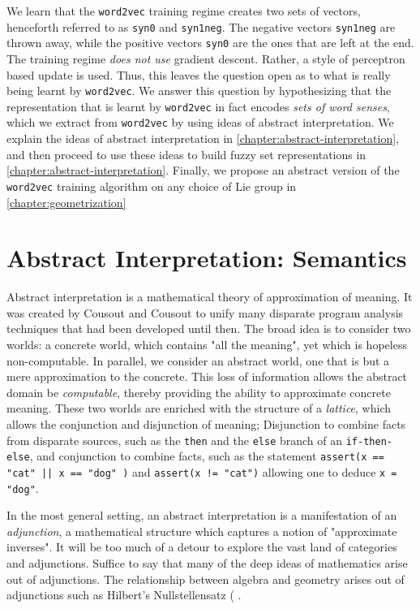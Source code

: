 \documentclass[11pt]{book}
\begin{document}
We learn that the \texttt{word2vec} training regime creates two sets of vectors, henceforth
referred to as \texttt{syn0} and \texttt{syn1neg}. The negative vectors \texttt{syn1neg} are thrown away, while the positive vectors \texttt{syn0} are the ones that are left at the end. The training regime \emph{does not use} gradient descent. Rather, a style of perceptron based update is used.  Thus, this leaves the question open as to what is really being learnt by \texttt{word2vec}. We answer this question by hypothesizing that the representation that is learnt by \texttt{word2vec} in fact encodes \emph{sets of word senses}, which we extract from \texttt{word2vec} by using ideas of abstract interpretation. We explain the ideas of abstract interpretation in \autoref{chapter:abstract-interpretation}, and then proceed to use these ideas to build fuzzy set representations in \autoref{chapter:abstract-interpretation}. Finally, we propose an abstract version of the \texttt{word2vec} training algorithm on any choice of Lie group in \autoref{chapter:geometrization}


\chapter{Abstract Interpretation: Semantics}
\label{chapter:abstract-interpretation}

Abstract interpretation is a mathematical theory of approximation of meaning. It was created by Cousout and Cousout to unify many disparate program analysis techniques that had been developed until then. The broad idea is to consider two worlds: a concrete world, which contains "all the meaning", yet which is hopeless non-computable. In parallel, we consider an abstract world, one that is but a mere approximation to the concrete. This loss of information allows the abstract domain be \emph{computable}, thereby providing the ability to
approximate concrete meaning. These two worlds are enriched with the structure of a \emph{lattice}, which allows the conjunction and disjunction of meaning; Disjunction to combine facts from disparate sources, such as the \texttt{then} and the \texttt{else} branch of an \texttt{if-then-else}, and conjunction to combine facts, such as the statement \texttt{assert(x == "cat" || x == "dog" )} and \texttt{assert(x != "cat")} allowing one to deduce \texttt{x = "dog"}. 


In the most general setting, an abstract interpretation is a manifestation of an \emph{adjunction}, a mathematical structure which captures a notion of "approximate inverses". It will be too much of a detour to explore the vast land of categories and adjunctions. Suffice to say that many of the deep ideas of mathematics arise out of adjunctions. The relationship between algebra and geometry arises out of adjunctions such as Hilbert's Nullstellensatz (%
. 
\end{document}
